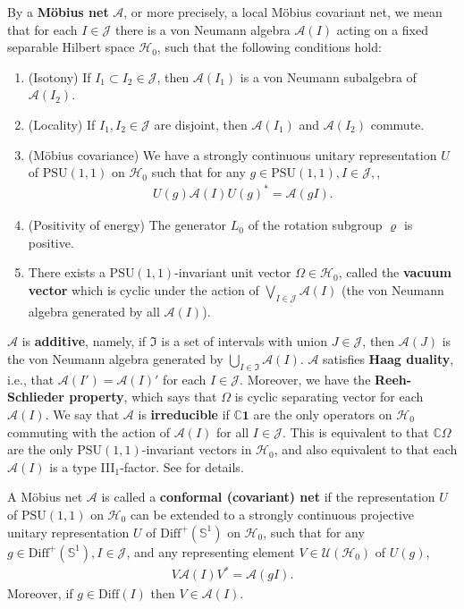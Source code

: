 \documentclass[12pt,a4paper,notitlepage]{article}
\theoremstyle{definition}
\theoremstyle{plain}
\newcommand{\fk}{\mathfrak}
\newcommand{\mc}{\mathcal}
\newcommand{\id}{\mathbf{1}}
\newcommand{\Diffp}{\mathrm{Diff}^+}
\newcommand{\Diff}{\mathrm{Diff}}
\newcommand{\PSU}{\mathrm{PSU}(1,1)}
\newcommand{\mbb}{\mathbb}
\newcommand{\Cbb}{\mathbb C}
\numberwithin{equation}{section}
\begin{document}
By a  \textbf{M\"obius net} $\mc A$, or more precisely, a local M\"obius covariant net, we mean that for each $I\in\mathcal J$ there is a von Neumann algebra $\mathcal A(I)$ acting on a fixed separable Hilbert space $\mathcal H_0$, such that the following conditions hold:
\begin{enumerate}[label=(\alph*)]
\item (Isotony) If $I_1\subset I_2\in\mathcal J$, then $\mathcal A(I_1)$ is a von Neumann subalgebra of $\mathcal A(I_2)$.
\item (Locality) If $I_1,I_2\in\mathcal J$ are disjoint, then $\mathcal A(I_1)$ and $\mathcal A(I_2)$ commute.
\item (M\"obius covariance) We have a strongly continuous  unitary representation $U$ of $\PSU$ on $\mc H_0$ such that for any $g\in\PSU, I\in\mc J,$, 
\begin{align*}
	U(g)\mc A(I)U(g)^*=\mc A(gI).
\end{align*}
\item (Positivity of energy) The generator $L_0$ of the rotation subgroup $\varrho$  is positive.
\item There exists a $\PSU$-invariant unit vector $\Omega\in\mc H_0$, called the \textbf{vacuum vector} which is  cyclic under the action of $\bigvee_{I\in\mathcal J}\mathcal A(I)$ (the von Neumann algebra generated by all $\mathcal A(I)$).
\end{enumerate}

$\mc A$ is \textbf{additive}, namely, if $\fk I$ is a set of intervals with union $J\in\mc J$, then $\mc A(J)$ is the von Neumann algebra generated by $\bigcup_{I\in\fk I}\mc A(I)$. $\mc A$ satisfies \textbf{Haag duality}, i.e., that $\mc A(I')=\mc A(I)'$ for each $I\in \mc J$. Moreover, we have the \textbf{Reeh-Schlieder property}, which says that $\Omega$ is  cyclic separating vector for each $\mc A(I)$. We say that $\mc A$ is \textbf{irreducible} if $\Cbb \id$ are the only operators on $\mc H_0$ commuting with the action of $\mc A(I)$ for all $I\in\mc J$. This is equivalent to that $\Cbb\Omega$ are the only $\PSU$-invariant vectors in $\mc H_0$, and also equivalent to that each $\mc A(I)$ is a type III$_1$-factor.  See \cite[Sec. 1]{GL96} for details.



A M\"obius net $\mc A$ is called a \textbf{conformal (covariant) net} if the representation $U$ of $\PSU$ on $\mc H_0$ can be extended to a strongly continuous projective unitary representation $U$ of $\Diffp(\mbb S^1)$ on $\mathcal H_0$, such that for any $g\in \Diffp(\mbb S^1),I\in\mathcal J$, and any representing element $V\in\mathcal U(\mathcal H_0)$ of $U(g)$,
\begin{align*}
	V\mathcal A(I)V^*=\mathcal A(gI).
\end{align*}
Moreover, if $g\in\Diff(I)$ then $V\in\mc A(I)$.
\end{document}
